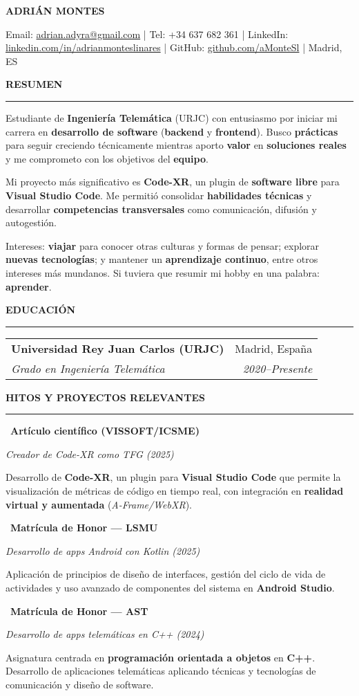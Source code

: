 \documentclass[10pt,a4paper]{article}
\makeatletter
\newcommand{\Name}[1]{%
	\begin{center}
		{\bfseries\fontsize{21}{23}\selectfont #1}\par
	\end{center}
}
\newcommand{\Contact}[1]{%
	\begin{center}
		\footnotesize #1
	\end{center}
}
\newcommand{\SectionTitle}[1]{%
	\vspace{5pt}%
	{\bfseries\MakeUppercase{#1}}\par
	\rule{\textwidth}{0.5pt}\vspace{3pt}%
}
\newcommand{\TightTwoCol}[4]{%
	\begingroup\setlength{\tabcolsep}{0pt}\renewcommand{\arraystretch}{0.95}%
	\noindent\begin{tabular*}{\textwidth}{@{}l@{\extracolsep{\fill}}r@{}}
		\textbf{#1} & #3 \\
		\textit{#2} & \textit{#4} \\
	\end{tabular*}\par\endgroup
}
\newcommand{\EduEntry}[4]{%
	\TightTwoCol{#1}{#2}{#3}{#4}\vspace{3pt}
}
\newcommand{\ProjEntry}[3]{%
	\noindent\textbullet\ \textbf{#1}\par
	\textit{#2}\par
	#3\par\vspace{3pt}%
}
\makeatother
\begin{document}
	
	\Name{ADRIÁN MONTES}
	
	\Contact{%
		Email: \href{mailto:adrian.adyra@gmail.com}{adrian.adyra@gmail.com} \enspace|\enspace
		Tel: +34 637 682 361 \enspace|\enspace
		LinkedIn: \href{https://linkedin.com/in/adrianmonteslinares}{linkedin.com/in/adrianmonteslinares} \enspace|\enspace
		GitHub: \href{https://github.com/aMonteSl}{github.com/aMonteSl} \enspace|\enspace
		Madrid, ES
	}
	
	\SectionTitle{Resumen}
	
	Estudiante de \textbf{Ingeniería Telemática} (URJC) con entusiasmo por iniciar mi carrera en \textbf{desarrollo de software} (\textbf{backend} y \textbf{frontend}). Busco \textbf{prácticas} para seguir creciendo técnicamente mientras aporto \textbf{valor} en \textbf{soluciones reales} y me comprometo con los objetivos del \textbf{equipo}.
	
	Mi proyecto más significativo es \textbf{Code\mbox{-}XR}, un plugin de \textbf{software libre} para \textbf{Visual Studio Code}. Me permitió consolidar \textbf{habilidades técnicas} y desarrollar \textbf{competencias transversales} como comunicación, difusión y autogestión.
	
	Intereses: \textbf{viajar} para conocer otras culturas y formas de pensar; explorar \textbf{nuevas tecnologías}; y mantener un \textbf{aprendizaje continuo}, entre otros intereses más mundanos. Si tuviera que resumir mi hobby en una palabra: \textbf{aprender}.
	
	\SectionTitle{Educación}
	\EduEntry{Universidad Rey Juan Carlos (URJC)}{Grado en Ingeniería Telemática}{Madrid, España}{2020--Presente}
	
	\SectionTitle{Hitos y proyectos relevantes}
	\ProjEntry
	{Artículo científico (VISSOFT/ICSME)}
	{Creador de Code-XR como TFG (2025)}
	{Desarrollo de \textbf{Code-XR}, un plugin para \textbf{Visual Studio Code} que permite la visualización
		de métricas de código en tiempo real, con integración en \textbf{realidad virtual y aumentada}
		(\textit{A-Frame/WebXR}).}
	\ProjEntry
	{Matrícula de Honor — LSMU}
	{Desarrollo de apps Android con Kotlin (2025)}
	{Aplicación de principios de diseño de interfaces, gestión del ciclo de vida de actividades y uso avanzado de
		componentes del sistema en \textbf{Android Studio}.}
	\ProjEntry
	{Matrícula de Honor — AST}
	{Desarrollo de apps telemáticas en C++ (2024)}
	{Asignatura centrada en \textbf{programación orientada a objetos} en \textbf{C++}. Desarrollo de aplicaciones telemáticas
		aplicando técnicas y tecnologías de comunicación y diseño de software.}
	
\end{document}
